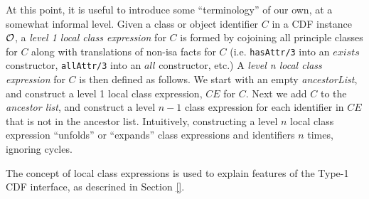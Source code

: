 At this point, it is useful to introduce some ``terminology'' of our
own, at a somewhat informal level.  Given a class or object identifier
$C$ in a CDF instance ${\cal O}$, a {\em level 1 local class expression}
for $C$ is formed by cojoining all principle classes for $C$ along
with translations of non-isa facts for $C$ (i.e. {\tt hasAttr/3} into
an $exists$ constructor, {\tt allAttr/3} into an $all$ constructor,
etc.)  A {\em level n local class expression} for $C$ is then defined
as follows.  We start with an empty {\em ancestorList}, and construct
a level 1 local class expression, $CE$ for $C$.  Next we add $C$ to
the {\em ancestor list}, and construct a level $n-1$ class expression
for each identifier in $CE$ that is not in the ancestor list.
Intuitively, constructing a level $n$ local class expression
``unfolds'' or ``expands'' class expressions and identifiers $n$
times, ignoring cycles.  

The concept of local class expressions is used to explain features of
the Type-1 CDF interface, as descrined in Section \ref{}.